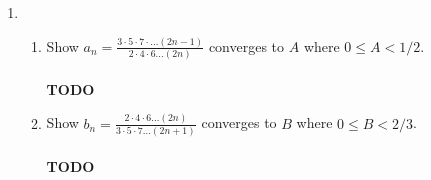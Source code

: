 \documentclass[12pt,letterpaper]{article}
\newcommand{\N}{\mathbb{N}}
\theoremstyle{case}
\theoremstyle{definition}
\begin{document}
\begin{enumerate}
\begin{enumerate}
\begin{proof}
		\end{proof}
		Now, we want to show that $ (a_n) $ is monotone decreasing; that is, we want to show that $(a_1 \geq a_2 \geq \dots \geq a_n)$.
		\begin{proof}
			We want to show that $(a_1 \geq a_2 \geq \dots \geq a_n),\ \forall\ n \in \N$. We prove this by method of mathematical induction.
			\\\\\textbf{Basis Step:} Since $5 \geq 3$, we have that $a_1 \geq a_2$.
			\\\\\textbf{Inductive Step:} Assume $a_n \geq a_{n+1}\ \forall\ n \in \N$.
			\\\\\textbf{Show:} We want to show that $a_{n+1} \geq a_{n+2}\ \forall\ n \in \N$. So,
			\begin{align*}
				a_{n+2} &= \sqrt{4+a_{n+1}} &\text{by the definition of the sequence} \\
				&\leq \sqrt{4+a_n} &\text{by the inductive hypothesis} \\
				&=a_{n+1}
			\end{align*}
			Thus we have that $a_{n+1} \geq a_{n+2}\ \forall\ n \in \N$.
		\end{proof}
	Since $(a_n)$ is both bounded and monotone decreasing, by the \textit{Monotone Convergence Theorem}, we have that $(a_n)$ converges. Also by the \textit{Monotone Sequence Property}, we have that $(a_n)$ converges to the following:
	\begin{align*}
		\lim (a_n) &= \inf \{a_n: n \in \N\} \\
		&= \frac{1}{2}+\frac{\sqrt{17}}{2} \approx 2.56155281281
	\end{align*}
	\end{enumerate}
	
	\item 
	\begin{enumerate}
		\item Show $a_n=\frac{3 \cdot 5 \cdot 7 \cdot \dots (2n-1)}{2 \cdot 4 \cdot 6 \dots (2n)}$ converges to $A$ where $0 \leq A < 1/2$.
		\\\\\textbf{TODO}
		
		\item Show $b_n = \frac{2 \cdot 4 \cdot 6 \dots (2n)}{3 \cdot 5 \cdot 7 \dots (2n+1)}$ converges to $B$ where $0 \leq B < 2/3$.
		\\\\\textbf{TODO}
	\end{enumerate}


\end{enumerate}
\end{document}
